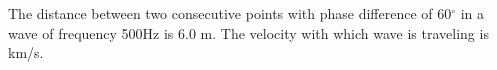 \item The distance between two consecutive points with phase difference of 60\(^\circ\) in a wave of frequency 500Hz is 6.0 m. The velocity with which wave is traveling is \underline{\hspace{2.5cm}} km/s.